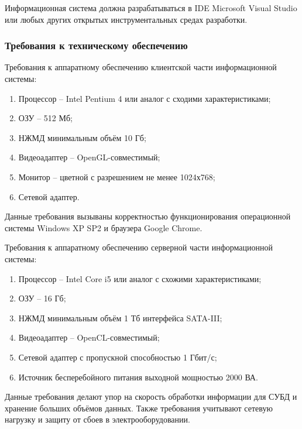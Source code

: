 Информационная система должна разрабатываться в IDE Microsoft Visual Studio или любых других открытых инструментальных средах разработки.

\subsubsection{Требования к техническому обеспечению}

Требования к аппаратному обеспечению клиентской части информационной системы:
\begin{enumerate}[-]
	\item Процессор -- Intel Pentium 4 или аналог с сходими характеристиками;
	\item ОЗУ -- 512 Мб;
	\item НЖМД минимальным объём 10 Гб;
	\item Видеоадаптер -- OpenGL-совместимый;
	\item Монитор -- цветной с разрешением не менее 1024х768;
	\item Сетевой адаптер.
\end{enumerate}

Данные требования вызываны корректностью функционирования операционной системы Windows XP SP2 и браузера Google Chrome.

Требования к аппаратному обеспечению серверной части информационной системы:
\begin{enumerate}[-]
	\item Процессор -- Intel Core i5 или аналог с схожими характеристиками;
	\item ОЗУ -- 16 Гб;
	\item НЖМД минимальным объём 1 Тб интерфейса SATA-III;
	\item Видеоадаптер -- OpenCL-совместимый;
	\item Сетевой адаптер с пропускной способностью 1 Гбит/с;
	\item Источник бесперебойного питания выходной мощностью 2000 ВА.
\end{enumerate}

Данные требования делают упор на скорость обработки информации для СУБД и хранение больших объёмов данных.
Также требования учитывают сетевую нагрузку и защиту от сбоев в электрооборудовании.

\clearpage
\newpage